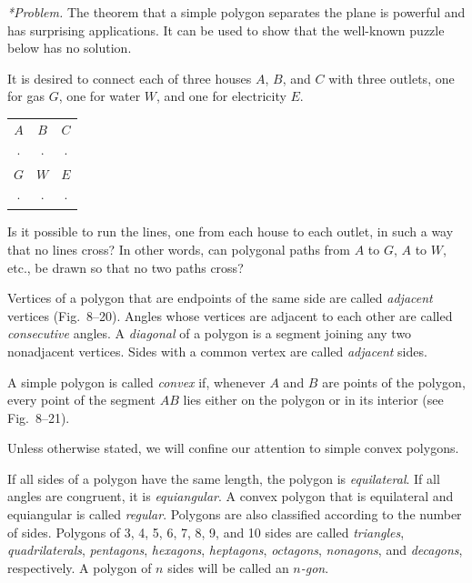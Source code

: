 \documentclass[11pt]{book}
\makeatletter
\newcommand{\VIIIutilities}{%
  \par\medskip\begin{center}
  \begin{tabular}{@{}c@{\hspace{3.2em}}c@{\hspace{3.2em}}c@{}}
    $A$ & $B$ & $C$ \\[-1pt]
    $\cdot$ & $\cdot$ & $\cdot$ \\[4pt]
    $G$ & $W$ & $E$ \\[-1pt]
    $\cdot$ & $\cdot$ & $\cdot$ \\
  \end{tabular}
  \end{center}\par\medskip}
\makeatother
\begin{document}
\emph{*Problem.} The theorem that a simple polygon separates the plane is
powerful and has surprising applications. It can be used to show that the
well-known puzzle below has no solution.

It is desired to connect each of three houses $A$, $B$, and $C$ with three
outlets, one for gas $G$, one for water $W$, and one for electricity $E$.

\VIIIutilities

Is it possible to run the lines, one from each house to each outlet, in such a
way that no lines cross? In other words, can polygonal paths from $A$ to $G$,
$A$ to $W$, etc., be drawn so that no two paths cross?

\begin{definition}
Vertices of a polygon that are endpoints of the same side are called
\emph{adjacent} vertices (Fig.~8--20). Angles whose vertices are adjacent to
each other are called \emph{consecutive} angles. A \emph{diagonal} of a
polygon is a segment joining any two nonadjacent vertices. Sides with a common
vertex are called \emph{adjacent} sides.
\end{definition}

\FIGVIIITWENTY

\begin{definition}
A simple polygon is called \emph{convex} if, whenever $A$ and $B$ are points
of the polygon, every point of the segment $AB$ lies either on the polygon or
in its interior (see Fig.~8--21).
\end{definition}

\FIGVIIITWENTYONE

\begin{remark}
Unless otherwise stated, we will confine our attention to simple convex
polygons.
\end{remark}

\begin{definition}
If all sides of a polygon have the same length, the polygon is
\emph{equilateral}. If all angles are congruent, it is \emph{equiangular}. A
convex polygon that is equilateral and equiangular is called \emph{regular}.
Polygons are also classified according to the number of sides. Polygons of 3,
4, 5, 6, 7, 8, 9, and 10 sides are called \emph{triangles},
\emph{quadrilaterals}, \emph{pentagons}, \emph{hexagons}, \emph{heptagons},
\emph{octagons}, \emph{nonagons}, and \emph{decagons}, respectively. A polygon
of $n$ sides will be called an \emph{$n$-gon}.
\end{definition}
\end{document}
